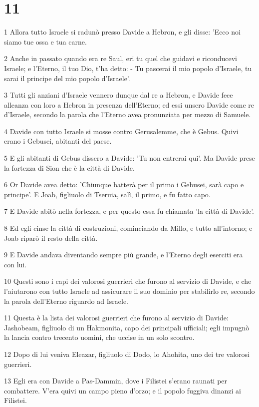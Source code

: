 \chapter{11}

\par 1 Allora tutto Israele si radunò presso Davide a Hebron, e gli disse: 'Ecco noi siamo tue ossa e tua carne.
\par 2 Anche in passato quando era re Saul, eri tu quel che guidavi e riconducevi Israele; e l'Eterno, il tuo Dio, t'ha detto: - Tu pascerai il mio popolo d'Israele, tu sarai il principe del mio popolo d'Israele'.
\par 3 Tutti gli anziani d'Israele vennero dunque dal re a Hebron, e Davide fece alleanza con loro a Hebron in presenza dell'Eterno; ed essi unsero Davide come re d'Israele, secondo la parola che l'Eterno avea pronunziata per mezzo di Samuele.
\par 4 Davide con tutto Israele si mosse contro Gerusalemme, che è Gebus. Quivi erano i Gebusei, abitanti del paese.
\par 5 E gli abitanti di Gebus dissero a Davide: 'Tu non entrerai qui'. Ma Davide prese la fortezza di Sion che è la città di Davide.
\par 6 Or Davide avea detto: 'Chiunque batterà per il primo i Gebusei, sarà capo e principe'. E Joab, figliuolo di Tseruia, salì, il primo, e fu fatto capo.
\par 7 E Davide abitò nella fortezza, e per questo essa fu chiamata 'la città di Davide'.
\par 8 Ed egli cinse la città di costruzioni, cominciando da Millo, e tutto all'intorno; e Joab riparò il resto della città.
\par 9 E Davide andava diventando sempre più grande, e l'Eterno degli eserciti era con lui.
\par 10 Questi sono i capi dei valorosi guerrieri che furono al servizio di Davide, e che l'aiutarono con tutto Israele ad assicurare il suo dominio per stabilirlo re, secondo la parola dell'Eterno riguardo ad Israele.
\par 11 Questa è la lista dei valorosi guerrieri che furono al servizio di Davide: Jashobeam, figliuolo di un Hakmonita, capo dei principali ufficiali; egli impugnò la lancia contro trecento uomini, che uccise in un solo scontro.
\par 12 Dopo di lui veniva Eleazar, figliuolo di Dodo, lo Ahohita, uno dei tre valorosi guerrieri.
\par 13 Egli era con Davide a Pas-Dammin, dove i Filistei s'erano raunati per combattere. V'era quivi un campo pieno d'orzo; e il popolo fuggiva dinanzi ai Filistei.
